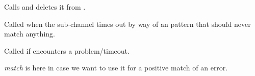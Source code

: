 \documentclass[letterpaper,10pt,openany]{sphinxmanual}
\begin{document}

\begin{fulllineitems}
\label{Applications/terminal/plugin_ssh:ssh.terminate_sub_channel}
Calls  and deletes it from .

\end{fulllineitems}


\begin{fulllineitems}
\label{Applications/terminal/plugin_ssh:ssh.timeout_sub_channel}
Called when the sub-channel times out by way of an
 pattern that should never match anything.

\end{fulllineitems}


\begin{fulllineitems}
\label{Applications/terminal/plugin_ssh:ssh.got_error}
Called if {\hyperref[Applications/terminal/plugin_ssh:ssh.execute_command]{}} encounters a problem/timeout.

\emph{match} is here in case we want to use it for a positive match of an error.

\end{fulllineitems}

\end{document}
